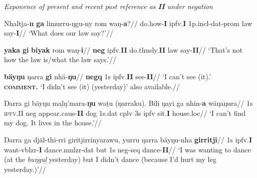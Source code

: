 \pex\textit{Exponence of present and recent past reference as \textbf{II} under negation}


\a\begingl%
\gla Nhaltja-\textbf{n} \textbf{ga} limurru-ŋgu-ny rom waŋ-\textbf{a}?//
\glb do.how-\textbf{I} \gls{ipfv}.\textbf{I} 1p.\gls{incl}-\gls{dat}-\gls{prom} law say-\textbf{I}//
\glft`What does our law say?'//\endgl

\a\begingl%
\gla \textbf{yaka} \textbf{gi} \textbf{biyak} rom waŋ-\textbf{i}//
\glb \textbf{\gls{neg}} \gls{ipfv}.\textbf{II} do.thusly.\textbf{II} law say-\textbf{II}//
\glft`That's not how the law is/what the law says.'//\endgl 




\a\begingl%
\gla \textbf{bäyŋu} ŋarra \textbf{gi} nhä-\textbf{ŋu}//
\glb \textbf{\gls{negq}} 1s \gls{ipfv}.\textbf{II} see-\textbf{II}//
\glft`I can't see (it).'\\
\textsc{\textbf{comment.}} `I didn't see (it) (yesterday)' also available.\trailingcitation{[AW 2018030]}//\endgl



\a\begingl\gla Ŋarra gi bäyŋu maḻŋ'mara-\textbf{ŋu} waṯu (ŋarraku). Bili ŋayi ga nhin-\textbf{a} wäŋaŋura//
\glb 1s \textsc{ipfv}.II \gls{neg} appear.\gls{caus}-\textbf{II} dog 1s.\gls{dat} \gls{cplv} 3s \gls{ipfv} sit.\textbf{I} house.\gls{loc}//
\glft`I can't find my dog. It lives in the house.'\trailingcitation{[DG~20190417]}//\endgl



\a\begingl\gla Ŋarra ga djäl-thi-rri giritjirrinyarawu, yurru ŋarra bäyŋu-nha \textbf{girritji}//
\glb 1s \gls{ipfv}.\textbf{I} want-\gls{vblzr}-\textbf{I} dance.\gls{nmlzr}-\gls{dat} but 1s \gls{neg}-\gls{seq} dance-\textbf{II}//
\glft`I was wanting to dance (at the \textit{buŋguḻ} yesterday) but I didn't dance (because I'd hurt my leg yesterday.)'\trailingcitation{[DG~20190417]}//\endgl
\xe


